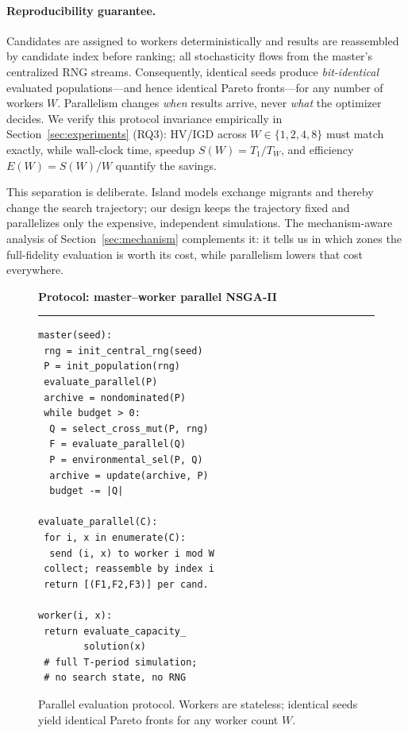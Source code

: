 \documentclass[10pt,conference,letterpaper]{IEEEtran}
\begin{document}
\paragraph{Reproducibility guarantee.}
Candidates are assigned to workers deterministically and results are
reassembled by candidate index before ranking; all stochasticity flows
from the master's centralized RNG streams. Consequently, identical seeds
produce \emph{bit-identical} evaluated populations---and hence identical
Pareto fronts---for any number of workers $W$. Parallelism changes
\emph{when} results arrive, never \emph{what} the optimizer decides. We
verify this protocol invariance empirically in
Section~\ref{sec:experiments} (RQ3): HV/IGD across $W\in\{1,2,4,8\}$ must
match exactly, while wall-clock time, speedup $S(W)=T_1/T_W$, and
efficiency $E(W)=S(W)/W$ quantify the savings.

This separation is deliberate. Island models exchange migrants and
thereby change the search trajectory; our design keeps the trajectory
fixed and parallelizes only the expensive, independent simulations. The
mechanism-aware analysis of Section~\ref{sec:mechanism} complements it:
it tells us in which zones the full-fidelity evaluation is worth its
cost, while parallelism lowers that cost everywhere.

\begin{figure}[t]
\centering
\begin{minipage}{0.96\columnwidth}
\footnotesize
\textbf{Protocol: master--worker parallel NSGA-II}
\par\smallskip\hrule\par\smallskip
\begin{verbatim}
master(seed):
 rng = init_central_rng(seed)
 P = init_population(rng)
 evaluate_parallel(P)
 archive = nondominated(P)
 while budget > 0:
  Q = select_cross_mut(P, rng)
  F = evaluate_parallel(Q)
  P = environmental_sel(P, Q)
  archive = update(archive, P)
  budget -= |Q|

evaluate_parallel(C):
 for i, x in enumerate(C):
  send (i, x) to worker i mod W
 collect; reassemble by index i
 return [(F1,F2,F3)] per cand.

worker(i, x):
 return evaluate_capacity_
        solution(x)
 # full T-period simulation;
 # no search state, no RNG
\end{verbatim}
\end{minipage}
\caption{Parallel evaluation protocol. Workers are stateless; identical
seeds yield identical Pareto fronts for any worker count $W$.}
\label{fig:protocol}
\end{figure}
\end{document}
